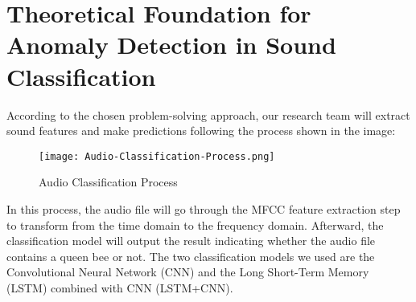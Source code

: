 \section{Theoretical Foundation for Anomaly Detection in Sound Classification}
According to the chosen problem-solving approach, our research team will extract sound
features and make predictions following the process shown in the image:

\vspace{-1em}
\begin{figure}[H]
  \centering
  \texttt{[image: Audio-Classification-Process.png]}
  \caption{Audio Classification Process}
  \label{fig:audio-classification-process}
\end{figure}
\vspace{-1em}

In this process, the audio file will go through the MFCC feature extraction step to
transform from the time domain to the frequency domain. Afterward, the classification
model will output the result indicating whether the audio file contains a queen bee or not.
The two classification models we used are the Convolutional Neural Network (CNN) and the
Long Short-Term Memory (LSTM) combined with CNN (LSTM+CNN).
